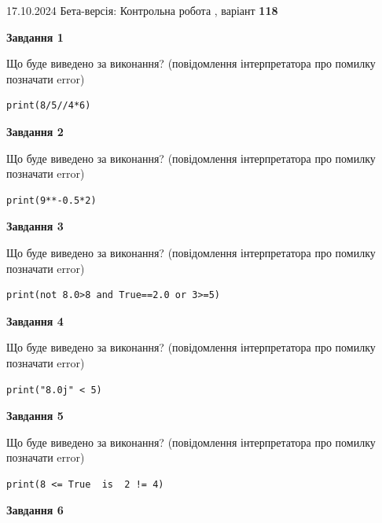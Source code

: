 \documentclass[12pt, ukrainian]{article}
\begin{document}
{\Large{17.10.2024 Бета-версія: Контрольна робота , варіант  \No \textbf { 118 }\par}}
{
\begin {large}
{\begin {center}\textbf{Завдання 1}\end {center}}

Що буде виведено за виконання? (повідомлення інтерпретатора про помилку позначати error)\par
\begin{verbatim}
print(8/5//4*6)
\end{verbatim}

{\begin {center}\textbf{Завдання 2}\end {center}}

Що буде виведено за виконання? (повідомлення інтерпретатора про помилку позначати error)\par
\begin{verbatim}
print(9**-0.5*2)
\end{verbatim}

{\begin {center}\textbf{Завдання 3}\end {center}}

Що буде виведено за виконання? (повідомлення інтерпретатора про помилку позначати error)\par
\begin{verbatim}
print(not 8.0>8 and True==2.0 or 3>=5)
\end{verbatim}

{\begin {center}\textbf{Завдання 4}\end {center}}

Що буде виведено за виконання? (повідомлення інтерпретатора про помилку позначати error)\par
\begin{verbatim}
print("8.0j" < 5)
\end{verbatim}

{\begin {center}\textbf{Завдання 5}\end {center}}

Що буде виведено за виконання? (повідомлення інтерпретатора про помилку позначати error)\par
\begin{verbatim}
print(8 <= True  is  2 != 4)
\end{verbatim}

{\begin {center}\textbf{Завдання 6}\end {center}}


\end{large}}
\end{document}
